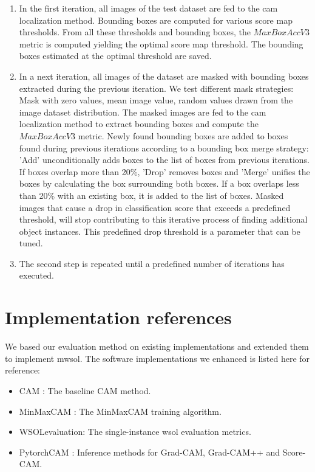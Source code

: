 \begin{enumerate}
    \item In the first iteration, all images of the test dataset are fed to the \acrshort{cam} localization method. Bounding boxes are computed for various score map thresholds. From all these thresholds and bounding boxes, the $MaxBoxAccV3$ metric is computed yielding the optimal score map threshold. The bounding boxes estimated at the optimal threshold are saved.
    \item In a next iteration, all images of the dataset are masked with bounding boxes extracted during the previous iteration. We test different mask strategies: Mask with zero values, mean image value, random values drawn from the image dataset distribution. The masked images are fed to the \acrshort{cam} localization method to extract bounding boxes and compute the $MaxBoxAccV3$ metric. Newly found bounding boxes are added to boxes found during previous iterations according to a bounding box merge strategy: 'Add' unconditionally adds boxes to the list of boxes from previous iterations. If boxes overlap more than 20\%, 'Drop' removes boxes and 'Merge' unifies the boxes by calculating the box surrounding both boxes. If a box overlaps less than 20\% with an existing box, it is added to the list of boxes. Masked images that cause a drop in classification score that exceeds a predefined threshold, will stop contributing to this iterative process of finding additional object instances. This predefined drop threshold is a parameter that can be tuned.
    \item The second step is repeated until a predefined number of iterations  has executed.
\end{enumerate}

\section{Implementation references}
We based our evaluation method on existing implementations and extended them to implement \acrlong{mwsol}. The software implementations we enhanced is listed here for reference:
\begin{itemize}
    \item CAM \cite{code:CAM}: The baseline CAM method.
    \item MinMaxCAM \cite{code:MinMaxCAM}: The MinMaxCAM training algorithm.
    \item WSOLevaluation\cite{code:WSOLevaluation}: The single-instance \acrshort{wsol} evaluation metrics.
    \item PytorchCAM \cite{code:PytorchCAM}: Inference methods for Grad-CAM, Grad-CAM++ and Score-CAM.
\end{itemize}